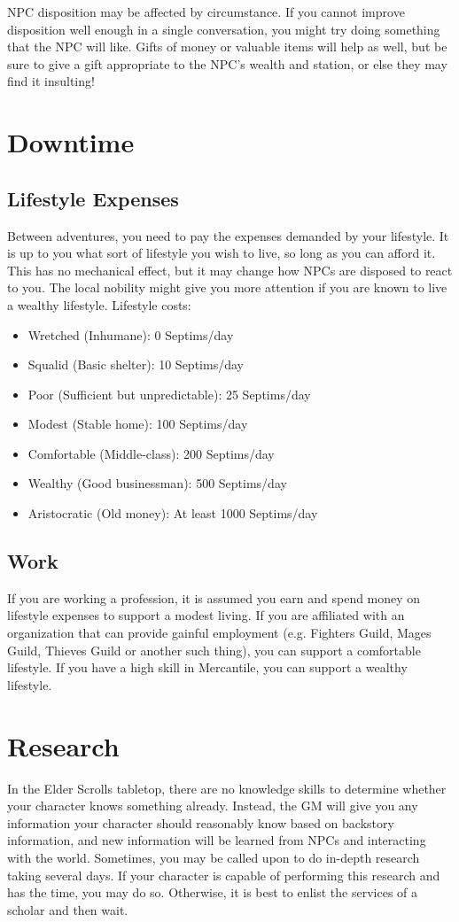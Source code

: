 \documentclass[12pt]{book}
\begin{document}
NPC disposition may be affected by circumstance. If you cannot improve disposition well enough in a single conversation, you might try doing something that the NPC will like. Gifts of money or valuable items will help as well, but be sure to give a gift appropriate to the NPC's wealth and station, or else they may find it insulting!

\section{Downtime}

\subsection{Lifestyle Expenses}
Between adventures, you need to pay the expenses demanded by your lifestyle. It is up to you what sort of lifestyle you wish to live, so long as you can afford it. This has no mechanical effect, but it may change how NPCs are disposed to react to you. The local nobility might give you more attention if you are known to live a wealthy lifestyle. Lifestyle costs:

\begin{itemize}
	\item Wretched (Inhumane): 0 Septims/day
	\item Squalid (Basic shelter): 10 Septims/day
	\item Poor (Sufficient but unpredictable): 25 Septims/day
	\item Modest (Stable home): 100 Septims/day
	\item Comfortable (Middle-class): 200 Septims/day
	\item Wealthy (Good businessman): 500 Septims/day
	\item Aristocratic (Old money): At least 1000 Septims/day
\end{itemize}

\subsection{Work}
If you are working a profession, it is assumed you earn and spend money on lifestyle expenses to support a modest living. If you are affiliated with an organization that can provide gainful employment (e.g. Fighters Guild, Mages Guild, Thieves Guild or another such thing), you can support a comfortable lifestyle. If you have a high skill in Mercantile, you can support a wealthy lifestyle.

\section{Research}
In the Elder Scrolls tabletop, there are no knowledge skills to determine whether your character knows something already. Instead, the GM will give you any information your character should reasonably know based on backstory information, and new information will be learned from NPCs and interacting with the world. Sometimes, you may be called upon to do in-depth research taking several days. If your character is capable of performing this research and has the time, you may do so. Otherwise, it is best to enlist the services of a scholar and then wait.
\end{document}
